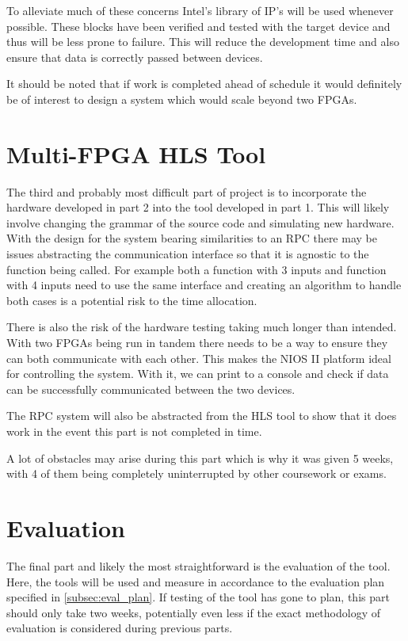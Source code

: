 To alleviate much of these concerns Intel's library of IP's will be used whenever possible. These blocks have been verified and tested with the target device and thus will be less prone to failure. This will reduce the development time and also ensure that data is correctly passed between devices.

It should be noted that if work is completed ahead of schedule it would definitely be of interest to design a system which would scale beyond two FPGAs.

\section{Multi-FPGA HLS Tool}

The third and probably most difficult part of project is to incorporate the hardware developed in part 2 into the tool developed in part 1. This will likely involve changing the grammar of the source code and simulating new hardware. With the design for the system bearing similarities to an RPC there may be issues abstracting the communication interface so that it is agnostic to the function being called. For example both a function with 3 inputs and function with 4 inputs need to use the same interface and creating an algorithm to handle both cases is a potential risk to the time allocation.

There is also the risk of the hardware testing taking much longer than intended. With two FPGAs being run in tandem there needs to be a way to ensure they can both communicate with each other. This makes the NIOS II platform ideal for controlling the system. With it, we can print to a console and check if data can be successfully communicated between the two devices.

The RPC system will also be abstracted from the HLS tool to show that it does work in the event this part is not completed in time.

A lot of obstacles may arise during this part which is why it was given 5 weeks, with 4 of them being completely uninterrupted by other coursework or exams.



\section{Evaluation}

The final part and likely the most straightforward is the evaluation of the tool. Here, the tools will be used and measure in accordance to the evaluation plan specified in \autoref{subsec:eval_plan}. If testing of the tool has gone to plan, this part should only take two weeks, potentially even less if the exact methodology of evaluation is considered during previous parts.


